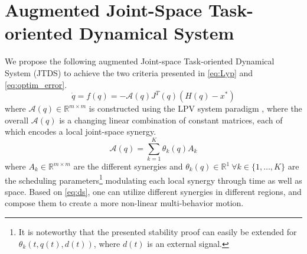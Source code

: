 \documentclass[letterpaper, 10 pt, conference,fleqn]{ieeeconf}
\begin{document}
\section{Augmented \textbf{J}oint-Space \textbf{T}ask-oriented \textbf{D}ynamical \textbf{S}ystem} \label{Sec:DS}
\label{sec:proposed_system}
We propose the following augmented Joint-space Task-oriented Dynamical System (JTDS) to achieve the two criteria presented in \eqref{eq:Lyp} and \eqref{eq:optim_error}.
\begin{equation}
\label{eq:ds}
\dot{q} = f(q) = -\mathcal{A}(q)J^T(q)(H(q) - x^*)
\end{equation}
where  $\mathcal{A}(q)\in \mathbb{R}^{m\times m}$ is constructed using the LPV system paradigm \cite{emedi2016fixed,7439839}, where the overall $\mathcal{A}(q)$ is a changing linear combination of constant  matrices, each of which encodes a local joint-space synergy. 
\begin{equation}
\label{eq:A_def}
\mathcal{A}(q) = \sum_{k=1}^{K}\theta_k(q)A_k 
\end{equation}
where $A_k\in \mathbb{R}^{m\times m} $ are the different synergies and $\theta_k(q)\in \mathbb{R}^{1}~\forall k\in\{1,\dots,K\} $ are the scheduling parameters\footnote{%
It is noteworthy that the presented stability proof can easily be extended for $\theta_k (t, q(t), d(t))$, where $d(t)$ is an external signal.} modulating each local synergy through time as well as space. Based on \eqref{eq:ds}, one can utilize different synergies in different regions, and compose them to create a more non-linear multi-behavior motion.
\end{document}
